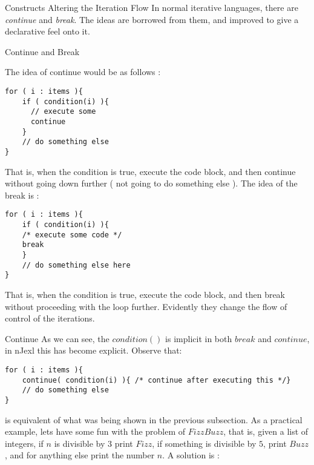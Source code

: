 \begin{section}{Constructs Altering the Iteration Flow}
In normal iterative languages, there are \emph{continue} and \emph{break}.
The ideas are borrowed from them, and improved to give a declarative feel onto it.

\begin{subsection}{Continue and Break}

The idea of continue would be as follows :
\begin{lstlisting}[style=JexlStyle]
for ( i : items ){
    if ( condition(i) ){
      // execute some 
      continue 
    }
    // do something else 
}
\end{lstlisting}
That is, when the condition is true, execute the code block, 
and then continue without going down further ( not going to do something else ). 
The idea of the break is :
\begin{center}\begin{minipage}{\linewidth}
\begin{lstlisting}[style=JexlStyle]
for ( i : items ){
    if ( condition(i) ){ 
    /* execute some code */  
    break 
    }
    // do something else here
}
\end{lstlisting}
\end{minipage}\end{center}

That is, when the condition is true, execute the code block, 
and then break without proceeding with the loop further. 
Evidently they change the flow of control of the iterations.
\end{subsection}

\begin{subsection}{Continue}
As we can see, the $condition()$ is implicit in both $break$ and $continue$,
in nJexl this has become explicit. Observe that:  

\begin{lstlisting}[style=JexlStyle]
for ( i : items ){
    continue( condition(i) ){ /* continue after executing this */} 
    // do something else 
}
\end{lstlisting}
is equivalent of what was being shown in the previous subsection.
As a practical example, lets have some fun with the problem of $FizzBuzz$,
that is, given a list of integers, if $n$ is divisible by $3$ print $Fizz$,
if something is divisible by $5$, print $Buzz$, and for anything else print the number $n$. 
A solution is :


\end{subsection}
\end{section}

